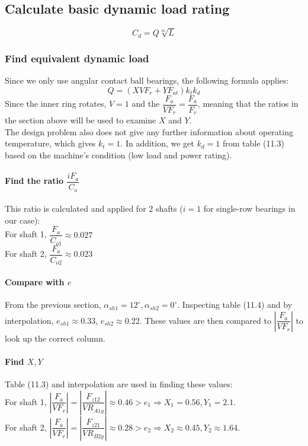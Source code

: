 \subsection{Calculate basic dynamic load rating}
\[C_d = Q\sqrt[m]{L}\]
\subsubsection{Find equivalent dynamic load} Since we only use angular contact ball bearings, the following formula applies:
\[Q = (XVF_r+YF_{at})k_tk_d\]
Since the inner ring rotates, $ V = 1 $ and the $\dfrac{F_a}{VF_r}=\dfrac{F_a}{F_r}$, meaning that the ratios in the section above will be used to examine $X$ and $Y$.\\
The design problem also does not give any further information about operating temperature, which gives $ k_t = 1 $. In addition, we get $ k_d = 1 $ from table (11.3) based on the machine's condition (low load and power rating).
\paragraph{Find the ratio $ \dfrac{iF_a}{C_o} $} This ratio is calculated and applied for 2 shafts ($ i = 1 $ for single-row bearings in our case):\\
For shaft 1, $ \dfrac{F_a}{C_{o1}} \approx 0.027$\\
For shaft 2, $ \dfrac{F_a}{C_{o2}}  \approx  0.023$
\paragraph{Compare with $ e $}
From the previous section, $ \alpha_{sh1} = 12^\circ, \alpha_{sh2} = 0^\circ $. Inspecting table (11.4) and by interpolation, $ e_{sh1} \approx  0.33$, $e_{sh2}  \approx 0.22 $. These values are then compared to $ \left| \dfrac{F_a}{VF_r} \right| $ to look up the correct column.
\paragraph{Find $ X,Y $} Table (11.3) and interpolation are used in finding these values:\\
For shaft 1, $ \left| \dfrac{F_a}{VF_r} \right| = \left| \dfrac{F_{z12}}{VR_{A1y}} \right| \approx 0.46 > e_{1} \Rightarrow X_{1} = 0.56, Y_{1} = 2.1$.\\
For shaft 2, $ \left| \dfrac{F_a}{VF_r} \right| = \left| \dfrac{F_{z21}}{VR_{B2y}} \right| \approx 0.28 > e_{2} \Rightarrow X_{2}  \approx  0.45, Y_{2}  \approx  1.64$.
